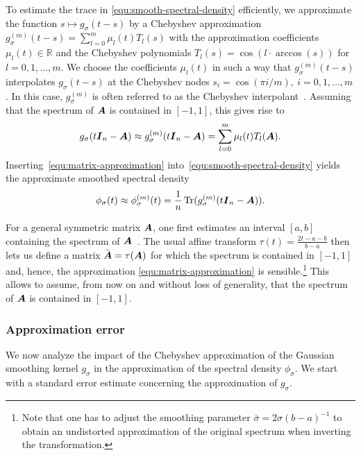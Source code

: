 To estimate the trace in \cref{equ:smooth-spectral-density} efficiently, we approximate the function 
$s\mapsto g_{\sigma}(t- s)$ by a
Chebyshev approximation $g_{\sigma}^{(m)}(t-s) = 
\sum_{l=0}^{m} \mu_l(t) T_l(s)$
with the approximation coefficients $\mu_l(t) \in \mathbb R$ and the Chebyshev polynomials
$T_l(s) = \cos(l \cdot \arccos(s))$ for $l = 0,1,\ldots,m$. We choose the coefficients $\mu_l(t)$ in such a way that $g_{\sigma}^{(m)}(t-s)$ interpolates $g_{\sigma}(t-s)$ at the Chebyshev nodes $s_i = \cos(\pi i / m),~i=0,1,\dots,m$. In this case, $g_{\sigma}^{(m)}$ is often referred to as the Chebyshev interpolant~\cite[Chapter 2]{trefethen-2020-approximation-theory}.
Assuming that the spectrum of $\boldsymbol{A}$ is contained in $[-1,1]$, this gives rise to
\begin{equation}
    g_{\sigma}(t\boldsymbol{I}_n - \boldsymbol{A}) \approx g_{\sigma}^{(m)}(t\boldsymbol{I}_n - \boldsymbol{A}) = \sum_{l=0}^{m} \mu_l(t) T_l(\boldsymbol{A}).
    \label{equ:matrix-approximation}
\end{equation}
Inserting~\cref{equ:matrix-approximation} into~\cref{equ:smooth-spectral-density} yields the approximate smoothed spectral density
\begin{equation}
    \phi_{\sigma}(t) \approx \phi_{\sigma}^{(m)}(t) =  \frac{1}{n} \operatorname{Tr}(g_{\sigma}^{(m)}(t \boldsymbol{I}_n - \boldsymbol{A})).
    \label{equ:expanded-spectral-density}
\end{equation}
\begin{remark}
For a general symmetric matrix $\boldsymbol{A}$, one first estimates an interval $[a,b]$ containing the spectrum of $\boldsymbol{A}$~\cite{zhou-2011-bounding-spectrum}. The usual affine transform
$\tau(t) = \frac{2t - a - b}{b - a}$
then lets us define a matrix $\bar{\boldsymbol{A}} = \tau(\boldsymbol{A})$ for which the spectrum is contained in $[-1, 1]$ and, hence, the approximation \cref{equ:matrix-approximation} is sensible.\footnote{Note that one has to adjust the smoothing parameter $\bar{\sigma} = 2 \sigma (b - a)^{-1}$ to obtain an undistorted approximation of the original spectrum when inverting the transformation.} This allows to assume, from now on and without loss of generality, that the spectrum of $\boldsymbol{A}$ is contained in $[-1, 1]$.
\end{remark}


\subsubsection{Approximation error}
\label{subsubsec:approximation-error}

We now analyze the impact of the Chebyshev approximation of the Gaussian smoothing kernel $g_{\sigma}$ in the approximation of the spectral density $\phi_{\sigma}$. We start with a standard error estimate concerning the approximation of $g_{\sigma}$.


